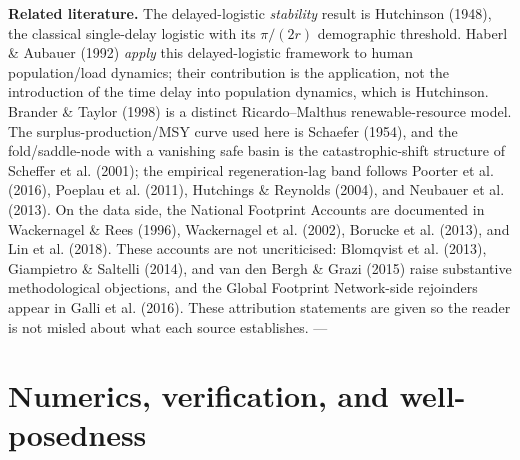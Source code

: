 \documentclass[11pt]{article}
\begin{document}
\textbf{Related literature.} The delayed-logistic \emph{stability} result is Hutchinson (1948), the classical single-delay logistic with its $\pi{}/(2r)$ demographic threshold. Haberl \& Aubauer (1992) \emph{apply} this delayed-logistic framework to human population/load dynamics; their contribution is the application, not the introduction of the time delay into population dynamics, which is Hutchinson. Brander \& Taylor (1998) is a distinct Ricardo–Malthus renewable-resource model. The surplus-production/MSY curve used here is Schaefer (1954), and the fold/saddle-node with a vanishing safe basin is the catastrophic-shift structure of Scheffer et al. (2001); the empirical regeneration-lag band follows Poorter et al. (2016), Poeplau et al. (2011), Hutchings \& Reynolds (2004), and Neubauer et al. (2013). On the data side, the National Footprint Accounts are documented in Wackernagel \& Rees (1996), Wackernagel et al. (2002), Borucke et al. (2013), and Lin et al. (2018). These accounts are not uncriticised: Blomqvist et al. (2013), Giampietro \& Saltelli (2014), and van den Bergh \& Grazi (2015) raise substantive methodological objections, and the Global Footprint Network-side rejoinders appear in Galli et al. (2016). These attribution statements are given so the reader is not misled about what each source establishes. ---

\section{Numerics, verification, and well-posedness}
\end{document}
